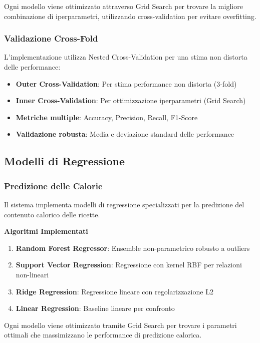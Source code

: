 \documentclass[12pt,a4paper]{article}
\begin{document}
Ogni modello viene ottimizzato attraverso Grid Search per trovare la migliore combinazione di iperparametri, utilizzando cross-validation per evitare overfitting.

\subsubsection{Validazione Cross-Fold}

L'implementazione utilizza Nested Cross-Validation per una stima non distorta delle performance:
\begin{itemize}
    \item \textbf{Outer Cross-Validation}: Per stima performance non distorta (3-fold)
    \item \textbf{Inner Cross-Validation}: Per ottimizzazione iperparametri (Grid Search)
    \item \textbf{Metriche multiple}: Accuracy, Precision, Recall, F1-Score
    \item \textbf{Validazione robusta}: Media e deviazione standard delle performance
\end{itemize}

\subsection{Modelli di Regressione}

\subsubsection{Predizione delle Calorie}

Il sistema implementa modelli di regressione specializzati per la predizione del contenuto calorico delle ricette.

\textbf{Algoritmi Implementati}

\begin{enumerate}
    \item \textbf{Random Forest Regressor}: Ensemble non-parametrico robusto a outliers
    \item \textbf{Support Vector Regression}: Regressione con kernel RBF per relazioni non-lineari
    \item \textbf{Ridge Regression}: Regressione lineare con regolarizzazione L2
    \item \textbf{Linear Regression}: Baseline lineare per confronto
\end{enumerate}

Ogni modello viene ottimizzato tramite Grid Search per trovare i parametri ottimali che massimizzano le performance di predizione calorica.
\end{document}
